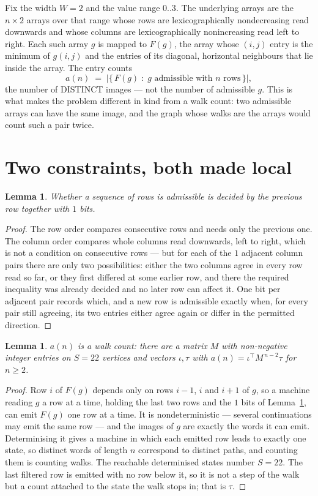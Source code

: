 \documentclass[11pt,a4paper]{article}
\theoremstyle{plain}
\newtheorem{lemma}[theorem]{Lemma}
\theoremstyle{definition}
\begin{document}
Fix the width $W=2$ and the value range $0..3$. The underlying arrays are the
$n\times2$ arrays over that range whose rows are lexicographically nondecreasing read downwards
and whose columns are lexicographically nonincreasing read left to right. Each such array $g$
is mapped to $F(g)$, the array whose $(i,j)$ entry is the minimum of $g(i,j)$ and the entries
of its diagonal, horizontal neighbours that lie inside the array. The entry counts
\[
a(n)\;=\;\bigl|\{\,F(g)\;:\;g\text{ admissible with }n\text{ rows}\,\}\bigr|,
\]
the number of DISTINCT images --- not the number of admissible $g$. This is what makes the
problem different in kind from a walk count: two admissible arrays can have the same image, and
the graph whose walks are the arrays would count such a pair twice.

\section{Two constraints, both made local}

\begin{lemma}\label{lem:local}
Whether a sequence of rows is admissible is decided by the previous row together with
$1$ bits.
\end{lemma}

\begin{proof}
The row order compares consecutive rows and needs only the previous one. The column order
compares whole columns read downwards, left to right, which is not a condition on consecutive
rows --- but for each of the $1$ adjacent column pairs there are only two possibilities:
either the two columns agree in every row read so far, or they first differed at some earlier
row, and there the required inequality was already decided and no later row can affect it. One
bit per adjacent pair records which, and a new row is admissible exactly when, for every pair
still agreeing, its two entries either agree again or differ in the permitted direction.
\end{proof}

\begin{lemma}\label{lem:det}
$a(n)$ is a walk count: there are a matrix $M$ with non-negative integer entries on $S=22$
vertices and vectors $\iota,\tau$ with $a(n)=\iota^{\!\top}M^{\,n-2}\tau$ for $n\ge2$.
\end{lemma}

\begin{proof}
Row $i$ of $F(g)$ depends only on rows $i-1$, $i$ and $i+1$ of $g$, so a machine reading $g$ a
row at a time, holding the last two rows and the $1$ bits of Lemma~\ref{lem:local}, can
emit $F(g)$ one row at a time. It is nondeterministic --- several continuations may emit the
same row --- and the images of $g$ are exactly the words it can emit. Determinising it gives a
machine in which each emitted row leads to exactly one state, so distinct words of length $n$
correspond to distinct paths, and counting them is counting walks. The reachable determinised
states number $S=22$. The last filtered row is emitted with no row below it, so it is not a
step of the walk but a count attached to the state the walk stops in; that is $\tau$.
\end{proof}
\end{document}

